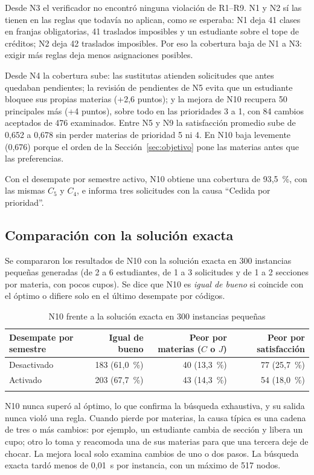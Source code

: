 Desde N3 el verificador no encontró ninguna violación de R1--R9. N1 y N2 sí las tienen en las reglas que todavía no aplican, como se esperaba: N1 deja 41 clases en franjas obligatorias, 41 traslados imposibles y un estudiante sobre el tope de créditos; N2 deja 42 traslados imposibles. Por eso la cobertura baja de N1 a N3: exigir más reglas deja menos asignaciones posibles.

Desde N4 la cobertura sube: las sustitutas atienden solicitudes que antes quedaban pendientes; la revisión de pendientes de N5 evita que un estudiante bloquee sus propias materias (+2,6 puntos); y la mejora de N10 recupera 50 principales más (+4 puntos), sobre todo en las prioridades 3 a 1, con 84 cambios aceptados de 476 examinados. Entre N5 y N9 la satisfacción promedio sube de 0,652 a 0,678 sin perder materias de prioridad 5 ni 4. En N10 baja levemente (0,676) porque el orden de la Sección~\ref{sec:objetivo} pone las materias antes que las preferencias.

Con el desempate por semestre activo, N10 obtiene una cobertura de 93,5~\%, con las mismas $C_5$ y $C_4$, e informa tres solicitudes con la causa ``Cedida por prioridad''.

\subsection{Comparación con la solución exacta}

Se compararon los resultados de N10 con la solución exacta en 300 instancias pequeñas generadas (de 2 a 6 estudiantes, de 1 a 3 solicitudes y de 1 a 2 secciones por materia, con pocos cupos). Se dice que N10 es \emph{igual de bueno} si coincide con el óptimo o difiere solo en el último desempate por códigos.

\begin{table}[htbp]
\caption{N10 frente a la solución exacta en 300 instancias pequeñas}\label{tab:exacto}
\small
\begin{tabular*}{\textwidth}{@{\extracolsep\fill}lrrr@{}}
\toprule
Desempate por semestre & Igual de bueno & Peor por materias ($C$ o $J$) & Peor por satisfacción \\
\midrule
Desactivado & 183 (61,0~\%) & 40 (13,3~\%) & 77 (25,7~\%) \\
Activado & 203 (67,7~\%) & 43 (14,3~\%) & 54 (18,0~\%) \\
\botrule
\end{tabular*}
\end{table}

N10 nunca superó al óptimo, lo que confirma la búsqueda exhaustiva, y su salida nunca violó una regla. Cuando pierde por materias, la causa típica es una cadena de tres o más cambios: por ejemplo, un estudiante cambia de sección y libera un cupo; otro lo toma y reacomoda una de sus materias para que una tercera deje de chocar. La mejora local solo examina cambios de uno o dos pasos. La búsqueda exacta tardó menos de 0,01~s por instancia, con un máximo de 517 nodos.

